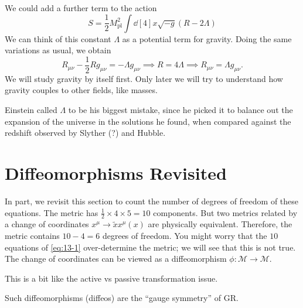We could add a further term to the action
\begin{equation}
  \label{eq:eintein-hilbert-action}
  S = \frac{1}{2} M^2_{\text{pl}} \int \dd[4]{x} \sqrt{-g} \left( R - 2 \Lambda \right)
\end{equation}
We can think of this constant $\Lambda$ as a potential term for gravity.
Doing the same variations as usual, we obtain
\begin{equation}
  R_{\mu\nu} - \frac{1}{2} R g_{\mu\nu} = - \Lambda g_{\mu\nu} \implies R = 4 \Lambda \implies R_{\mu\nu} = \Lambda g_{\mu\nu}.
  \label{eq:13-1}
\end{equation}
We will study gravity by itself first. Only later we will try to understand how gravity couples to other fields, like masses.
\begin{leftbar}
  \begin{remark}
    Einstein called $\Lambda$ to be his biggest mistake, since he picked it to balance out the expansion of the universe in the solutions he found, when compared against the redshift observed by Slyther (?) and Hubble.
  \end{remark}
\end{leftbar}

\section{Diffeomorphisms Revisited}%
\label{sec:diffeomorphisms_revisited}

In part, we revisit this section to count the number of degrees of freedom of these equations.
The metric has $\frac{1}{2} \times 4 \times 5 = 10$ components.
But two metrics related by a change of coordinates $x^{\mu} \to \widetilde{x}x^{\mu}(x)$ are physically equivalent. Therefore, the metric contains $10 - 4 = 6$ degrees of freedom.
You might worry that the $10$ equations of \eqref{eq:13-1} over-determine the metric; we will see that this is not true.
The change of coordinates can be viewed as a diffeomorphism $\phi \colon \mathcal{M} \to \mathcal{M}$.
\begin{leftbar}
  \begin{remark}
    This is a bit like the active vs passive transformation issue.
  \end{remark}
\end{leftbar}
Such diffeomorphisms (diffeos) are the ``gauge symmetry'' of GR.
